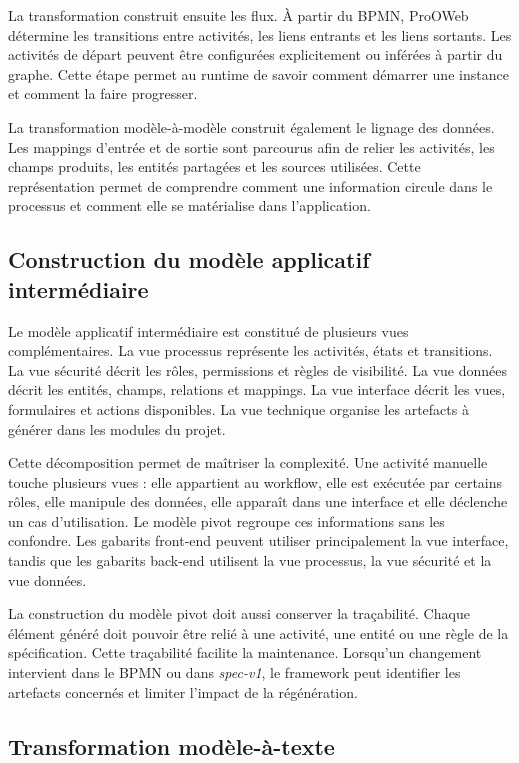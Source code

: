 La transformation construit ensuite les flux. À partir du BPMN, ProOWeb détermine les transitions entre activités, les liens entrants et les liens sortants. Les activités de départ peuvent être configurées explicitement ou inférées à partir du graphe. Cette étape permet au runtime de savoir comment démarrer une instance et comment la faire progresser.

La transformation modèle-à-modèle construit également le lignage des données. Les mappings d'entrée et de sortie sont parcourus afin de relier les activités, les champs produits, les entités partagées et les sources utilisées. Cette représentation permet de comprendre comment une information circule dans le processus et comment elle se matérialise dans l'application.

\subsection{Construction du modèle applicatif intermédiaire}

Le modèle applicatif intermédiaire est constitué de plusieurs vues complémentaires. La vue processus représente les activités, états et transitions. La vue sécurité décrit les rôles, permissions et règles de visibilité. La vue données décrit les entités, champs, relations et mappings. La vue interface décrit les vues, formulaires et actions disponibles. La vue technique organise les artefacts à générer dans les modules du projet.

Cette décomposition permet de maîtriser la complexité. Une activité manuelle touche plusieurs vues : elle appartient au workflow, elle est exécutée par certains rôles, elle manipule des données, elle apparaît dans une interface et elle déclenche un cas d'utilisation. Le modèle pivot regroupe ces informations sans les confondre. Les gabarits front-end peuvent utiliser principalement la vue interface, tandis que les gabarits back-end utilisent la vue processus, la vue sécurité et la vue données.

La construction du modèle pivot doit aussi conserver la traçabilité. Chaque élément généré doit pouvoir être relié à une activité, une entité ou une règle de la spécification. Cette traçabilité facilite la maintenance. Lorsqu'un changement intervient dans le BPMN ou dans \textit{spec-v1}, le framework peut identifier les artefacts concernés et limiter l'impact de la régénération.

\subsection{Transformation modèle-à-texte}

